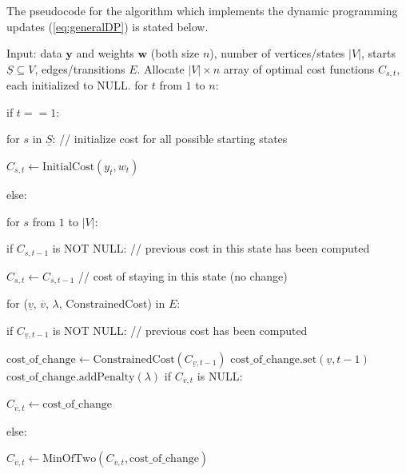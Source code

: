 \documentclass[article]{jss}
\begin{document}
The pseudocode for the algorithm which implements the dynamic
programming updates (\ref{eq:generalDP}) is stated below.
\begin{algorithm}
\begin{algorithmic}[1]
\STATE Input: data $\mathbf y$ and weights $\mathbf w$ (both size $n$), 
number of vertices/states $|V|$, starts $\underline S\subseteq V$, 
edges/transitions $E$.
\STATE Allocate $|V|\times n$ array of optimal cost functions $C_{s,t}$, 
each initialized to NULL.
\STATE for $t$ from $1$ to $n$:
\begin{ALC@g}
  \STATE if $t==1$:
  \begin{ALC@g}
    \STATE for $s$ in $\underline S$: // initialize cost for all possible starting states
    \begin{ALC@g}
      \STATE $C_{s,t}\gets\text{InitialCost}(y_t, w_t)$
    \end{ALC@g}
  \end{ALC@g}
  \STATE else:
  \begin{ALC@g}
    \STATE for $s$ from $1$ to $|V|$: 
    \begin{ALC@g}
      \STATE if $C_{s,t-1}$ is NOT NULL: // previous cost in this state has been computed
      \begin{ALC@g}
        \STATE $C_{s,t}\gets C_{s,t-1}$ // cost of staying in this state (no change)
      \end{ALC@g}
    \end{ALC@g}
    \STATE for ($\underline v$, $\overline v$, $\lambda$,
    ConstrainedCost) in $E$:
    \begin{ALC@g}
      \STATE if $C_{\underline v,t-1}$ is NOT NULL: // previous cost has been computed
      \begin{ALC@g}
        \STATE
        $\text{cost\_of\_change}\gets
        \text{ConstrainedCost}(C_{\underline v, t-1})$
        \STATE
        $\text{cost\_of\_change.set}
        (\underline v, t-1)$
        \STATE
        $\text{cost\_of\_change.addPenalty}
        (\text{$\lambda$})$
        \STATE if $C_{\overline v,t}$ is NULL:
        \begin{ALC@g}
          \STATE $C_{\overline v,t}\gets\text{cost\_of\_change}$
        \end{ALC@g}
        \STATE else:
        \begin{ALC@g}
          \STATE
          $C_{\overline v,t}\gets \text{MinOfTwo}(C_{\overline v,t},
          \text{cost\_of\_change})$
        \end{ALC@g}
      \end{ALC@g}

\end{ALC@g}
\end{ALC@g}
\end{ALC@g}
\end{algorithmic}
\end{algorithm}
\end{document}
